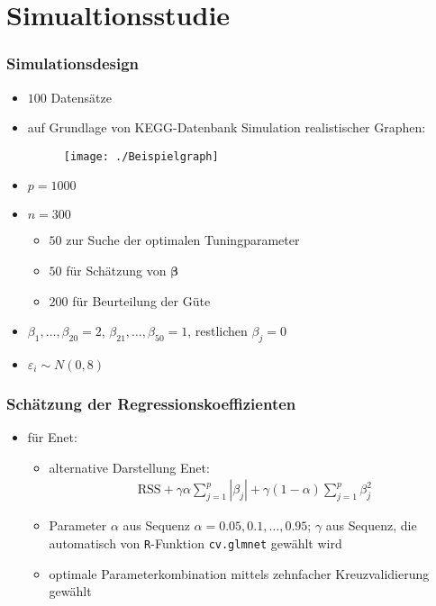\documentclass{beamer}
\begin{document}
\section{Simualtionsstudie}
\begin{frame}
	\frametitle{Simulationsdesign}
	\begin{itemize}
	\item $100$ Datensätze
	\item auf Grundlage von KEGG-Datenbank Simulation realistischer Graphen:
	\begin{figure}
	\centering
	\texttt{[image: ./Beispielgraph]}
	\label{fig:beispiel}
	\end{figure}
	\item $p=1000$
	\item $n=300$ 
	\begin{itemize}
	\item $50$ zur Suche der optimalen Tuningparameter
	\item $50$ für Schätzung von $\boldsymbol{\beta}$
	\item $200$ für Beurteilung der Güte
	\end{itemize}
	\item $\beta_1,\dots,\beta_{20}=2$, $\beta_{21},\dots,\beta_{50}=1$, restlichen $\beta_j=0$
	\item $\varepsilon_i \sim N(0,8)$  
	\end{itemize}
\end{frame}

\begin{frame}
	\frametitle{Schätzung der Regressionskoeffizienten}
	\begin{itemize}
	\item für Enet:
	\begin{itemize}
	\item alternative Darstellung Enet:
	\begin{align*}
	\text{RSS}+\gamma \alpha \sum_{j=1}^{p}|\beta_j| + \gamma (1-\alpha) \sum_{j=1}^{p}\beta_j^2
	\end{align*}
	\item Parameter $\alpha$ aus Sequenz $\alpha={0.05, 0.1, \dots ,0.95}$; $\gamma$ aus Sequenz, die automatisch von \texttt{R}-Funktion \texttt{cv.glmnet} gewählt wird 
	\item optimale Parameterkombination mittels zehnfacher Kreuzvalidierung gewählt
	\end{itemize}
	\end{itemize}
\end{frame}
\end{document}
